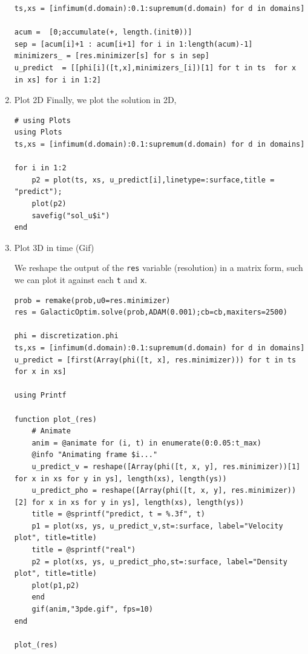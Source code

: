 \documentclass[11pt]{article}
\begin{document}
\begin{enumerate}
\begin{verbatim}
ts,xs = [infimum(d.domain):0.1:supremum(d.domain) for d in domains]

acum =  [0;accumulate(+, length.(initθ))]
sep = [acum[i]+1 : acum[i+1] for i in 1:length(acum)-1]
minimizers_ = [res.minimizer[s] for s in sep]
u_predict  = [[phi[i]([t,x],minimizers_[i])[1] for t in ts  for x in xs] for i in 1:2]
\end{verbatim}

\item Plot 2D
\label{sec:org79ce62b}
Finally, we plot the solution in 2D,
\begin{verbatim}
# using Plots
using Plots
ts,xs = [infimum(d.domain):0.1:supremum(d.domain) for d in domains]

for i in 1:2
    p2 = plot(ts, xs, u_predict[i],linetype=:surface,title = "predict");
    plot(p2)
    savefig("sol_u$i")
end
\end{verbatim}

\item Plot 3D in time (Gif)
\label{sec:org9c09303}

We reshape the output of the \texttt{res} variable (resolution) in a matrix form, such
we can plot it against each \texttt{t} and \texttt{x}.

\begin{verbatim}
prob = remake(prob,u0=res.minimizer)
res = GalacticOptim.solve(prob,ADAM(0.001);cb=cb,maxiters=2500)

phi = discretization.phi
ts,xs = [infimum(d.domain):0.1:supremum(d.domain) for d in domains]
u_predict = [first(Array(phi([t, x], res.minimizer))) for t in ts for x in xs]

using Printf

function plot_(res)
    # Animate
    anim = @animate for (i, t) in enumerate(0:0.05:t_max)
	@info "Animating frame $i..."
	u_predict_v = reshape([Array(phi([t, x, y], res.minimizer))[1] for x in xs for y in ys], length(xs), length(ys))
	u_predict_pho = reshape([Array(phi([t, x, y], res.minimizer))[2] for x in xs for y in ys], length(xs), length(ys))
	title = @sprintf("predict, t = %.3f", t)
	p1 = plot(xs, ys, u_predict_v,st=:surface, label="Velocity plot", title=title)
	title = @sprintf("real")
	p2 = plot(xs, ys, u_predict_pho,st=:surface, label="Density plot", title=title)
	plot(p1,p2)
    end
    gif(anim,"3pde.gif", fps=10)
end

plot_(res)
\end{verbatim}
\end{enumerate}
\end{document}
